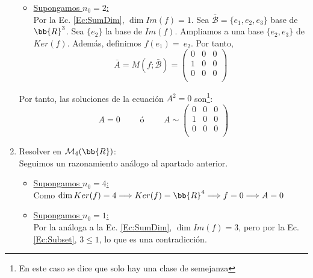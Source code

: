 \begin{ejercicio}
\begin{enumerate}
\begin{itemize}
           \item \underline{Supongamos $n_0 = 2$:}\\
           Por la Ec. \ref{Ec:SumDim}, $\dim Im(f)=1$. Sea $\bar{\mathcal{B}}=\{e_1, e_2, e_3\}$ base de $\bb{R}^3$. Sea $\{e_2\}$ la base de $Im(f)$. Ampliamos a una base $\{e_2, e_3\}$ de $Ker(f)$. Además, definimos $f(e_1)=~e_2$.
           Por tanto,
           $$\bar{A} = M(f; \bar{\mathcal{B}}) = \left( \begin{array}{ccc}
               0 & 0 & 0 \\
               1 & 0 & 0 \\
               0 & 0 & 0 \\
           \end{array}\right)$$
       \end{itemize}
    
       Por tanto, las soluciones de la ecuación $A^2 = 0$ son\footnote{En este caso se dice que solo hay una clase de semejanza}:
       \begin{equation*}
           A = 0
           \qquad \text{ ó } \qquad
           A\sim \left( \begin{array}{ccc}
               0 & 0 & 0 \\
               1 & 0 & 0 \\
               0 & 0 & 0 \\
           \end{array}\right)
       \end{equation*}

        \item Resolver en $\mathcal{M}_4(\bb{R})$:\\
        Seguimos un razonamiento análogo al apartado anterior.
       \begin{itemize}
           \item \underline{Supongamos $n_0 = 4$:}\\
           Como $\dim Ker(f)=4 \Longrightarrow Ker(f) = \bb{R}^4 \Longrightarrow f=0 \Longrightarrow A=0$
    
           \item \underline{Supongamos $n_0 = 1$:}\\
           Por la análoga a la Ec. \ref{Ec:SumDim}, $\dim Im(f)=3$, pero por la Ec. \ref{Ec:Subset}, $3\leq 1$, lo que es una contradicción.
    

\end{itemize}
\end{enumerate}
\end{ejercicio}
